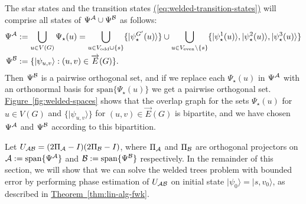 \documentclass{article}
\newcommand{\eq}[1]{\hyperref[eq:#1]{(\ref*{eq:#1})}}
\newcommand{\thm}[1]{\hyperref[thm:#1]{Theorem~\ref*{thm:#1}}}
\newcommand{\fig}[1]{\hyperref[fig:#1]{Figure~\ref*{fig:#1}}}
\def\ket#1{{\lvert}#1\rangle}
\renewcommand{\>}{\rangle}
\newcommand{\<}{\langle}
\renewcommand{\(}{\left(}
\renewcommand{\)}{\right)}
\begin{document}
The star states  and the transition states \eq{welded-transition-states} will comprise all states of $\Psi^{\cal A}\cup \Psi^{\cal B}$ as follows:
\begin{equation}
\begin{split}
\Psi^{\cal A} &:= \bigcup_{u\in V(G)}\Psi_\star(u)=\bigcup_{u\in V_{\mathrm{odd}}\cup\{s\}}\{\ket{\psi_\star^{G'}(u)}\}\cup\bigcup_{u\in V_{\mathrm{even}}\setminus\{s\}}\{\ket{\psi^1_\star(u)},\ket{\psi^2_\star(u)},\ket{\psi^3_\star(u)}\}\\
\Psi^{\cal B} &:= \{\ket{\psi_{u,v}}:(u,v)\in\overrightarrow{E}(G)\}.
\end{split}\label{eq:welded-Psi}
\end{equation}
Then $\Psi^{\cal B}$ is a pairwise orthogonal set, and if we replace each $\Psi_\star(u)$ in $\Psi^{\cal A}$ with an orthonormal basis for $\mathrm{span}\{\Psi_\star(u)\}$ we get a pairwise orthogonal set. \fig{welded-spaces} shows that the overlap graph for the sets $\Psi_\star(u)$ for $u\in V(G)$ and $\{\ket{\psi_{u,v}}\}$ for $(u,v)\in\overrightarrow{E}(G)$ is bipartite, and we have chosen $\Psi^{\cal A}$ and $\Psi^{\cal B}$ according to this bipartition. 

Let $U_{\cal AB}=(2\Pi_{\cal A}-I)(2\Pi_{\cal B}-I)$, where $\Pi_{\cal A}$ and $\Pi_{\cal B}$ are orthogonal projectors on ${\cal A}:=\mathrm{span}\{\Psi^{\cal A}\}$ and ${\cal B}:=\mathrm{span}\{\Psi^{\cal B}\}$ respectively.
In the remainder of this section, we will show that we can solve the welded trees problem with bounded error by performing phase estimation of $U_{\cal AB}$ on initial state $\ket{\psi_0}=\ket{s,v_0}$, as described in \thm{lin-alg-fwk}. 
\end{document}
